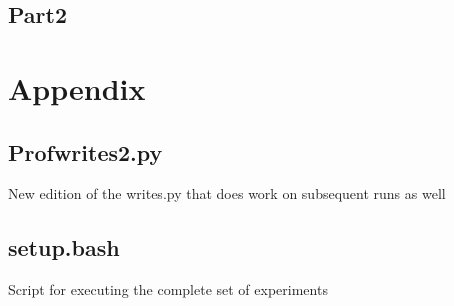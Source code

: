 \section{Part2}

\appendix
\chapter{Appendix}
\section{Profwrites2.py}\label{app:prof}
New edition of the writes.py that does work on subsequent runs as well


\section{setup.bash}\label{app:setup}
Script for executing the complete set of experiments


